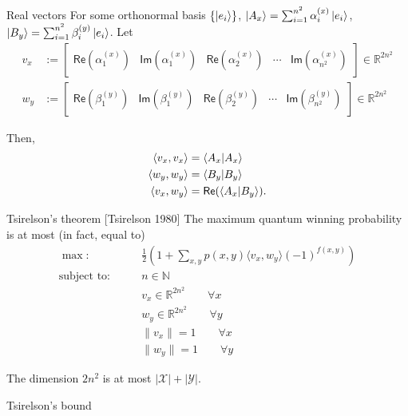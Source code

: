 \documentclass{beamer}
\newcommand\emm[1]{\textcolor{redorange}{{#1}}}
\begin{document}
\begin{frame}{Real vectors}
For some orthonormal basis $\{\ket{e_i}\}$,
$\ket{A_x}=\sum_{i=1}^{n^2} \alpha_i^{(x)}\ket{e_i}$,
$\ket{B_y}=\sum_{i=1}^{n^2} \beta_i^{(y)}\ket{e_i}$.
Let
\begin{align*}
v_x &:= \begin{bmatrix}\mathsf{Re}(\alpha_1^{(x)})& \mathsf{Im}(\alpha_1^{(x)}) &\mathsf{Re}(\alpha_2^{(x)})&\dotsm&\mathsf{Im}(\alpha_{n^2}^{(x)})\end{bmatrix}\in\mathbb{R}^{2n^2}\\
w_y &:= \begin{bmatrix}\mathsf{Re}(\beta_1^{(y)})& \mathsf{Im}(\beta_1^{(y)}) &\mathsf{Re}(\beta_2^{(y)})&\dotsm&\mathsf{Im}(\beta_{n^2}^{(y)})\end{bmatrix}\in\mathbb{R}^{2n^2}
\end{align*}

\vspace{2em}
Then,
\begin{align*}
\langle v_x, v_x\rangle &= \braket{A_x|A_x}\\
\langle w_y, w_y\rangle &= \braket{B_y|B_y}\\
\langle v_x, w_y\rangle &= \mathsf{Re}(\braket{A_x|B_y}).
\end{align*}
\end{frame}

\begin{frame}{Tsirelson's theorem [Tsirelson 1980]}
\small
The maximum quantum winning probability is \emm{at most (in fact, equal to)}
\begin{align*}
\max\colon\qquad& \frac12\left(1 + \sum_{x,y}p(x,y) \langle v_x, w_y\rangle(-1)^{f(x,y)}\right)\\
\text{subject to}\colon\qquad&
n\in\mathbb{N}\\
&v_x \in \mathbb{R}^{2n^2}\qquad \forall x\\
&w_y \in \mathbb{R}^{2n^2}\qquad \forall y\\
&\|v_x\| = 1\qquad \forall x\\
&\|w_y\| = 1\qquad \forall y
\end{align*}

\vspace{1.5em}
\centering

The dimension $2n^2$ is at most $|\mathcal{X}|+|\mathcal{Y}|$.

\vspace{2em}
\Large
Tsirelson's bound
\end{frame}
\end{document}
